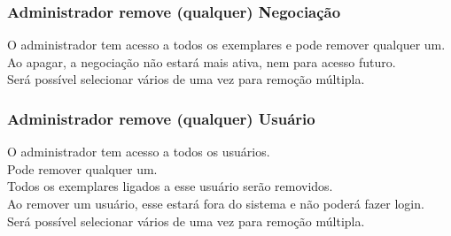 \subsubsection{Administrador remove (qualquer) Negociação}
\begin{tabbing}
\pgs
\>\>O administrador tem acesso a todos os exemplares e pode remover qualquer um.\\
\>\>Ao apagar, a negociação não estará mais ativa, nem para acesso futuro.\\
\>\>Será possível selecionar vários de uma vez para remoção múltipla.
\end{tabbing}

\subsubsection{Administrador remove (qualquer) Usuário}
\begin{tabbing}
\pgs
\>\>O administrador tem acesso a todos os usuários.\\
\>\>Pode remover qualquer um.\\
\>\>\>Todos os exemplares ligados a esse usuário serão removidos.\\
\>\>Ao remover um usuário, esse estará fora do sistema e não poderá fazer login.\\
\>\>Será possível selecionar vários de uma vez para remoção múltipla.
\end{tabbing}
